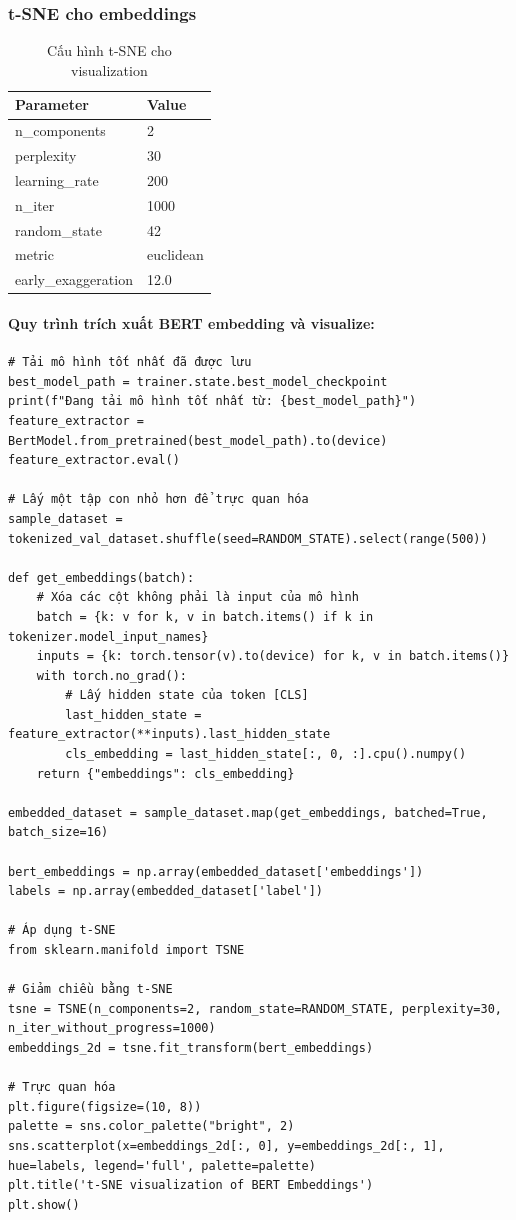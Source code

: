 \subsubsection{t-SNE cho embeddings}
\label{subsubsec:tsne_embeddings}

\begin{table}[H]
\centering
\caption{Cấu hình t-SNE cho visualization}
\label{tab:tsne_params}
\begin{tabular}{ll}
\toprule
\textbf{Parameter} & \textbf{Value} \\
\midrule
n\_components & 2 \\
perplexity & 30 \\
learning\_rate & 200 \\
n\_iter & 1000 \\
random\_state & 42 \\
metric & euclidean \\
early\_exaggeration & 12.0 \\
\bottomrule
\end{tabular}
\end{table}

\paragraph{Quy trình trích xuất BERT embedding và visualize:}
\begin{verbatim}
# Tải mô hình tốt nhất đã được lưu
best_model_path = trainer.state.best_model_checkpoint
print(f"Đang tải mô hình tốt nhất từ: {best_model_path}")
feature_extractor = BertModel.from_pretrained(best_model_path).to(device)
feature_extractor.eval()

# Lấy một tập con nhỏ hơn để trực quan hóa
sample_dataset = tokenized_val_dataset.shuffle(seed=RANDOM_STATE).select(range(500))

def get_embeddings(batch):
    # Xóa các cột không phải là input của mô hình
    batch = {k: v for k, v in batch.items() if k in tokenizer.model_input_names}
    inputs = {k: torch.tensor(v).to(device) for k, v in batch.items()}
    with torch.no_grad():
        # Lấy hidden state của token [CLS]
        last_hidden_state = feature_extractor(**inputs).last_hidden_state
        cls_embedding = last_hidden_state[:, 0, :].cpu().numpy()
    return {"embeddings": cls_embedding}

embedded_dataset = sample_dataset.map(get_embeddings, batched=True, batch_size=16)

bert_embeddings = np.array(embedded_dataset['embeddings'])
labels = np.array(embedded_dataset['label'])

# Áp dụng t-SNE
from sklearn.manifold import TSNE

# Giảm chiều bằng t-SNE
tsne = TSNE(n_components=2, random_state=RANDOM_STATE, perplexity=30, n_iter_without_progress=1000)
embeddings_2d = tsne.fit_transform(bert_embeddings)

# Trực quan hóa
plt.figure(figsize=(10, 8))
palette = sns.color_palette("bright", 2)
sns.scatterplot(x=embeddings_2d[:, 0], y=embeddings_2d[:, 1], hue=labels, legend='full', palette=palette)
plt.title('t-SNE visualization of BERT Embeddings')
plt.show()
\end{verbatim}

